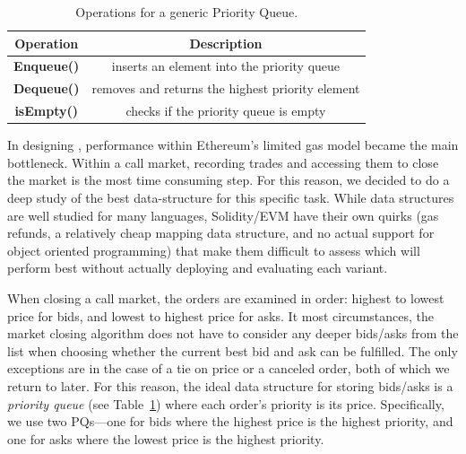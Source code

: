 \begin{table}[t]
\centering
\begin{tabular}{|c|c|}
\hline

\textbf{Operation}   & \textbf{Description}    \\ \hline

	\textbf{Enqueue()}       	& inserts an element into the priority queue                        \\ \hline
	\textbf{Dequeue()}		& removes and returns the highest priority element 		\\ \hline
	\textbf{isEmpty()}			& checks if the priority queue is empty 					\\ \hline

\end{tabular}
\caption{\footnotesize{Operations for a generic Priority Queue.}
\label{tab:PQ_API}}
\end{table}

In designing \cm, performance within Ethereum's limited gas model became the main bottleneck. Within a call market, recording trades and accessing them to close the market is the most time consuming step. For this reason, we decided to do a deep study of the best data-structure for this specific task. While data structures are well studied for many languages, Solidity/EVM have their own quirks (\eg gas refunds, a relatively cheap mapping data structure, and no actual support for object oriented programming) that make them difficult to assess which will perform best without actually deploying and evaluating each variant. 

When closing a call market, the orders are examined in order: highest to lowest price for bids, and lowest to highest price for asks. It most circumstances, the market closing algorithm does not have to consider any deeper bids/asks from the list when choosing whether the current best bid and ask can be fulfilled. The only exceptions are in the case of a tie on price or a canceled order, both of which we return to later. For this reason, the ideal data structure for storing bids/asks is a \textit{priority queue} (see Table~\ref{tab:PQ_API}) where each order's priority is its price. Specifically, we use two PQs---one for bids where the highest price is the highest priority, and one for asks where the lowest price is the highest priority. 

